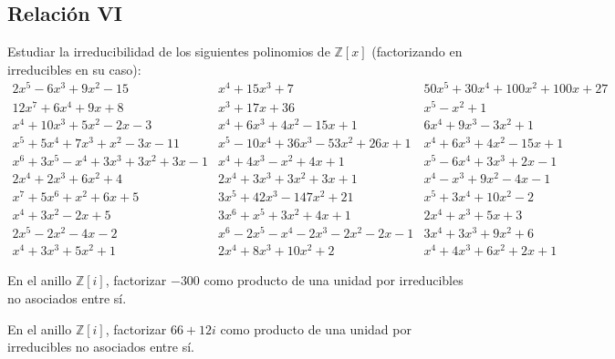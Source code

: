 \subsection{Relación VI}

\begin{ejercicio}
    Estudiar la irreducibilidad de los siguientes polinomios de $\mathbb{Z}[x]$ (factorizando en irreducibles en su caso):
    \begin{equation*}
        \begin{array}{lll}
            \scriptstyle 2x^5-6x^3+9x^2-15 & \scriptstyle x^4+15x^3+7 & \scriptstyle 50x^5+30x^4+100x^2+100x+27 \\
            \scriptstyle 12x^7+6x^4+9x+8 & \scriptstyle x^3+17x+36 & \scriptstyle x^5-x^2+1 \\
            \scriptstyle x^4+10x^3+5x^2-2x-3 & \scriptstyle x^4+6x^3+4x^2-15x+1 & \scriptstyle 6x^4+9x^3-3x^2+1 \\
            \scriptstyle x^5+5x^4+7x^3+x^2-3x-11 & \scriptstyle x^5-10x^4+36x^3-53x^2+26x+1 & \scriptstyle x^4+6x^3+4x^2-15x+1 \\
            \scriptstyle x^6+3x^5-x^4+3x^3+3x^2+3x-1 & \scriptstyle x^4+4x^3-x^2+4x+1 & \scriptstyle x^5-6x^4+3x^3+2x-1 \\
            \scriptstyle 2x^4+2x^3+6x^2+4 & \scriptstyle 2x^4+3x^3+3x^2+3x+1 & \scriptstyle x^4-x^3+9x^2-4x-1 \\
            \scriptstyle x^7+5x^6+x^2+6x+5 & \scriptstyle 3x^5+42x^3-147x^2+21 & \scriptstyle x^5+3x^4+10x^2-2 \\
            \scriptstyle x^4+3x^2-2x+5 & \scriptstyle 3x^6+x^5+3x^2+4x+1 & \scriptstyle 2x^4+x^3+5x+3 \\
            \scriptstyle 2x^5-2x^2-4x-2 & \scriptstyle x^6-2x^5-x^4-2x^3-2x^2-2x-1 & \scriptstyle 3x^4+3x^3+9x^2+6 \\
            \scriptstyle x^4+3x^3+5x^2+1 & \scriptstyle 2x^4+8x^3+10x^2+2 & \scriptstyle x^4+4x^3+6x^2+2x+1
        \end{array}
    \end{equation*}
\end{ejercicio}

\begin{ejercicio}
    En el anillo $\mathbb{Z}[i]$, factorizar $-300$ como producto de una unidad por irreducibles no asociados entre sí.
\end{ejercicio}

\begin{ejercicio}
    En el anillo $\mathbb{Z}[i]$, factorizar $66+12i$ como producto de una unidad por irreducibles no asociados entre sí.
\end{ejercicio}

